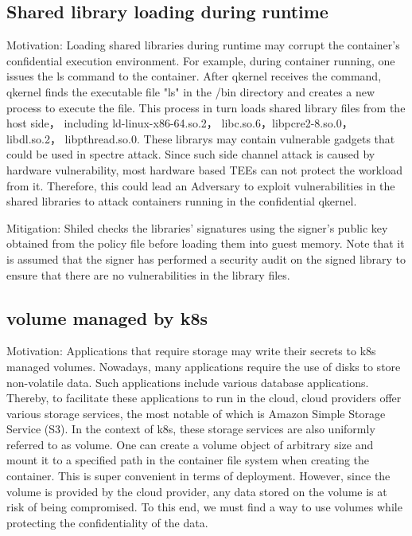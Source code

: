 \subsection{Shared library loading during runtime}
Motivation: Loading shared libraries during runtime may corrupt the container's confidential execution environment.
For example, during container running, one issues the ls command to the container. After qkernel receives the command, qkernel finds the executable file "ls" in the /bin directory and creates a new process to execute the file. This process in turn loads shared library files from the host side， including ld-linux-x86-64.so.2， 
libc.so.6，libpcre2-8.so.0， libdl.so.2， libpthread.so.0. These librarys may contain vulnerable gadgets that could be used in spectre attack.
Since such side channel attack is caused by hardware vulnerability, most hardware based TEEs can not protect the workload from it. Therefore, this could lead an Adversary to exploit vulnerabilities in the shared libraries to attack containers running in the confidential qkernel.

Mitigation: Shiled checks the libraries' signatures using the signer's public key obtained from the policy file before loading them into guest memory. Note that it is assumed that the signer has performed a security audit on the signed library to ensure that there are no vulnerabilities in the library files.

\subsection{volume managed by k8s}
\label{volume_managed_by_k8s}
Motivation: Applications that require storage may write their secrets to k8s managed volumes.
Nowadays, many applications require the use of disks to store non-volatile data. Such applications include various database applications. Thereby, to facilitate these applications to run in the cloud, cloud providers offer various storage services, 
the most notable of which is Amazon Simple Storage Service (S3). In the context of k8s, these storage services are also uniformly referred to as volume. One can create a volume object of arbitrary size and mount it to a specified path in the container file 
system when creating the container. This is super convenient in terms of deployment. However, since the volume is provided by the cloud provider, any data stored on the volume is at risk of being compromised. To this end, we must find a way to use volumes while protecting 
the confidentiality of the data.

